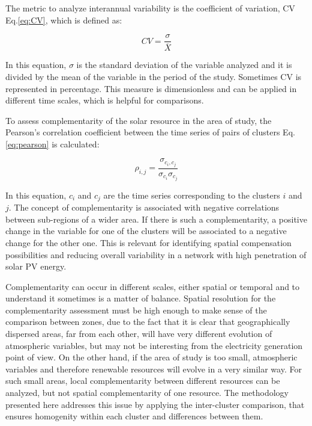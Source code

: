 The metric to analyze interannual variability is the coefficient of variation, CV Eq.\ref{eq:CV}, which is defined as:

\begin{equation}\label{eq:CV}
  CV=\frac{\sigma}{\overline{X}}
\end{equation}

In this equation, $\sigma$ is the standard deviation of the variable analyzed and it is divided by the mean of the variable in the period of the study. Sometimes CV is represented in percentage. This measure is dimensionless and can be applied in different time scales, which is helpful for comparisons.

To assess complementarity of the solar resource in the area of study, the Pearson's correlation coefficient between the time series of pairs of clusters Eq.\ref{eq:pearson} is calculated:

\begin{equation}\label{eq:pearson}
  \rho_{i,j}=\frac{\sigma_{c_i,c_j}}{\sigma_{c_i}\sigma_{c_j}}
\end{equation}

In this equation, $c_i$ and $c_j$ are the time series corresponding to the clusters $i$ and $j$. The concept of complementarity is associated with negative correlations between sub-regions of a wider area. If there is such a complementarity, a positive change in the variable for one of the clusters will be associated to a negative change for the other one. This is relevant for identifying spatial compensation possibilities and reducing overall variability in a network with high penetration of solar PV energy.

Complementarity can occur in different scales, either spatial or temporal and to understand it sometimes is a matter of balance. Spatial resolution for the complementarity assessment must be high enough to make sense of the comparison between zones, due to the fact that it is clear that geographically dispersed areas, far from each other, will have very different evolution of atmospheric variables, but may not be interesting from the electricity generation point of view. On the other hand, if the area of study is too small, atmospheric variables and therefore renewable resources will evolve in a very similar way. For such small areas, local complementarity between different resources can be analyzed, but not spatial complementarity of one resource. The methodology presented here addresses this issue by applying the inter-cluster comparison, that ensures homogenity within each cluster and differences between them.

